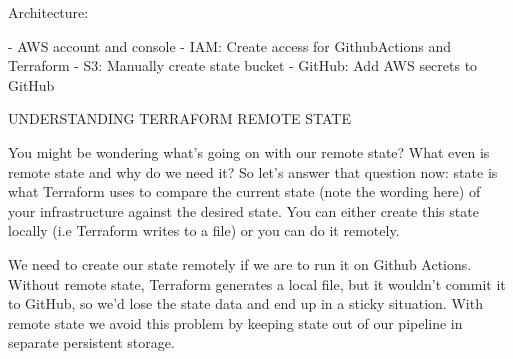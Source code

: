 Architecture:

- AWS account and console
- IAM: Create access for GithubActions and Terraform
- S3: Manually create state bucket
- GitHub: Add AWS secrets to GitHub

UNDERSTANDING TERRAFORM REMOTE STATE

You might be wondering what’s going on with our remote state? What even is remote state and why do we need it? So let’s answer that question now: state is what Terraform uses to compare the current state (note the wording here) of your infrastructure against the desired state. You can either create this state locally (i.e Terraform writes to a file) or you can do it remotely.

We need to create our state remotely if we are to run it on Github Actions. Without remote state, Terraform generates a local file, but it wouldn’t commit it to GitHub, so we’d lose the state data and end up in a sticky situation. With remote state we avoid this problem by keeping state out of our pipeline in separate persistent storage.